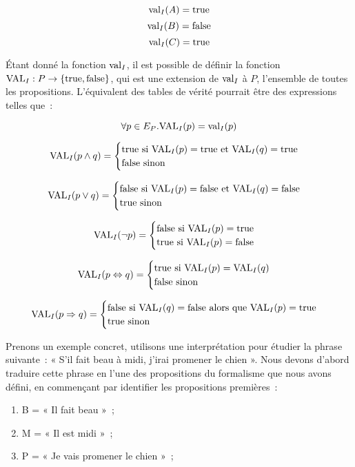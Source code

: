 \[\mathrm{val}_I(A) = \mathrm{true}\]
\[\mathrm{val}_I(B) = \mathrm{false}\]
\[\mathrm{val}_I(C) = \mathrm{true}\]

Étant donné la fonction $\mathrm{val}_I$, il est possible de définir la fonction
$\mathrm{VAL}_I : P \rightarrow \{\mathrm{true}, \mathrm{false}\}$, qui est une extension de
$\mathrm{val}_I$ à $P$, l’ensemble de toutes les propositions. L’équivalent des
tables de vérité pourrait être des expressions telles que~:

\[\forall p \in E_P. \mathrm{VAL}_I(p) = \mathrm{val}_I(p)\]

\[\mathrm{VAL}_I(p \land q) = \begin{cases}
  \mathrm{true} \mbox{ si } \mathrm{VAL}_I(p)= \mathrm{true}  \mbox{ et } \mathrm{VAL}_I(q) = \mathrm{true} \\
  \mathrm{false}\mbox{ sinon}
\end{cases}\]

\[\mathrm{VAL}_I(p \lor q) = \begin{cases}
  \mathrm{false} \mbox{ si } \mathrm{VAL}_I(p)= \mathrm{false}  \mbox{ et } \mathrm{VAL}_I(q) = \mathrm{false} \\
  \mathrm{true}\mbox{ sinon}
\end{cases}\]

\[\mathrm{VAL}_I(\lnot p) = \begin{cases}
  \mathrm{false}\mbox{ si }\mathrm{VAL}_I(p) = \mathrm{true} \\
  \mathrm{true}\mbox{ si }\mathrm{VAL}_I(p) = \mathrm{false}
\end{cases}\]

\[\mathrm{VAL}_I(p \Leftrightarrow q) = \begin{cases}
  \mathrm{true}\mbox{ si }\mathrm{VAL}_I(p) = \mathrm{VAL}_I(q) \\
  \mathrm{false}\mbox{ sinon}
\end{cases}\]

\[\mathrm{VAL}_I(p \Rightarrow q) = \begin{cases}
  \mathrm{false} \mbox{ si } \mathrm{VAL}_I(q) = \mathrm{false} \mbox{ alors que } \mathrm{VAL}_I(p) = \mathrm{true} \\
  \mathrm{true}\mbox{ sinon}
\end{cases}\]

Prenons un exemple concret, utilisons une interprétation pour étudier la phrase
suivante~: « S'il fait beau à midi, j'irai promener le chien ». Nous devons
d’abord traduire cette phrase en l’une des propositions du formalisme que nous
avons défini, en commençant par identifier les propositions premières~:

\begin{enumerate}
\item B = « Il fait beau »~;
\item M = « Il est midi »~;
\item P = « Je vais promener le chien »~;
\end{enumerate}

